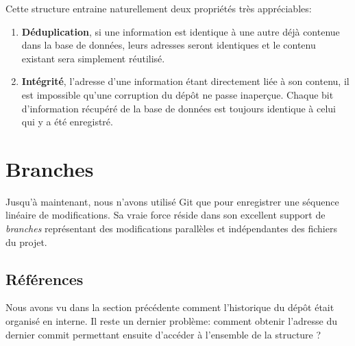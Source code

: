 \documentclass[11pt,a4paper]{article}
\begin{document}
Cette structure entraine naturellement deux propriétés très appréciables:

\begin{enumerate}
	\item \textbf{Déduplication}, 
	si une information est identique à une autre déjà contenue dans la base de données, leurs adresses seront identiques et le contenu existant sera simplement réutilisé.
	
	\item \textbf{Intégrité},
	l'adresse d'une information étant directement liée à son contenu, il est impossible qu'une corruption du dépôt ne passe inaperçue.
	Chaque bit d'information récupéré de la base de données est toujours identique à celui qui y a été enregistré.
\end{enumerate}

\section{Branches}

Jusqu'à maintenant, nous n'avons utilisé Git que pour enregistrer une séquence linéaire de modifications. Sa vraie force réside dans son excellent support de \textit{branches} représentant des modifications parallèles et indépendantes des fichiers du projet.

\subsection{Références}

Nous avons vu dans la section précédente comment l'historique du dépôt était organisé en interne. Il reste un dernier problème: comment obtenir l'adresse du dernier commit permettant ensuite d'accéder à l'ensemble de la structure ?
\end{document}
